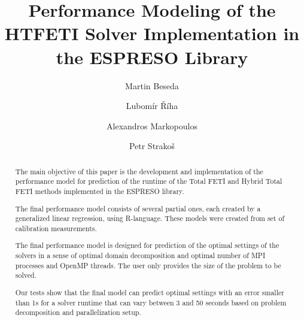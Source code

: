 \documentclass[runningheads,a4paper]{llncs}
\begin{document}
\title{Performance Modeling of the HTFETI Solver Implementation in the ESPRESO Library}
%
%
\author{Martin Beseda \and Lubom\'{i}r \v{R}\'{i}ha \and Alexandros Markopoulos \and Petr Strako\v{s}}
%
%
%

\maketitle              %

\begin{abstract}

The main objective of this paper is the development and implementation of the 
performance model for prediction of the runtime of the 
Total FETI and Hybrid Total FETI methods implemented in the ESPRESO library.

The final performance model consists of several partial ones, each created by 
a generalized linear regression, using R-language. These models were created from 
set of calibration measurements.

The final performance model is designed for prediction of the optimal settings 
of the solvers in a sense of optimal domain decomposition and optimal number of 
MPI processes and OpenMP threads. The user only provides the size of the problem 
to be solved.

Our tests show that the final model can predict optimal settings with an error 
smaller than 1s for a solver runtime that can vary between 3 and 50 seconds 
based on problem decomposition and parallelization setup.  

\end{abstract}
%
\end{document}
